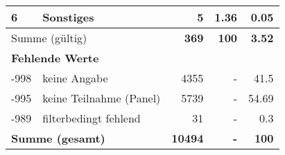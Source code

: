 \begin{longtable}{lXrrr}
     6 &
     \multicolumn{1}{X}{ Sonstiges   } &


       \num{5} &
       \num[round-mode=places,round-precision=2]{1,36} &
         \num[round-mode=places,round-precision=2]{0,05} \\
     \midrule
     \multicolumn{2}{l}{Summe (gültig)} &
       \textbf{\num{369}} &
     \textbf{100} &
       \textbf{\num[round-mode=places,round-precision=2]{3,52}} \\
     \multicolumn{5}{l}{\textbf{Fehlende Werte}}\\
       -998 &
       keine Angabe &
         \num{4355} &
        - &
         \num[round-mode=places,round-precision=2]{41,5} \\
       -995 &
       keine Teilnahme (Panel) &
         \num{5739} &
        - &
         \num[round-mode=places,round-precision=2]{54,69} \\
       -989 &
       filterbedingt fehlend &
         \num{31} &
        - &
         \num[round-mode=places,round-precision=2]{0,3} \\
     \midrule
     \multicolumn{2}{l}{\textbf{Summe (gesamt)}} &
          \textbf{\num{10494}} &
        \textbf{-} &
        \textbf{100} \\
     \bottomrule
     \end{longtable}
     
